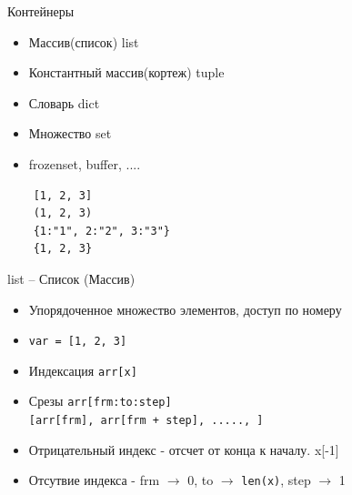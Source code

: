 \documentclass{article}
\begin{document}
\LARGE

\begin{center} Контейнеры \end{center}
\begin{itemize}
	\item Массив(список) list
	\item Константный массив(кортеж) tuple
	\item Словарь dict
	\item Множество set
	\item frozenset, buffer, ....
\end{itemize}
\begin{lstlisting}
	[1, 2, 3]
	(1, 2, 3)
	{1:"1", 2:"2", 3:"3"}
	{1, 2, 3}
\end{lstlisting}
\newpage

\begin{center} list – Список (Массив) \end{center}
\begin{itemize}
	\item Упорядоченное множество элементов, доступ по номеру
	\item \lstinline!var = [1, 2, 3]!
	\item Индексация \lstinline!arr[x]!
	\item Срезы 
			\lstinline!arr[frm:to:step]! \\
			\lstinline![arr[frm], arr[frm + step], ....., ]!
	\item Отрицательный индекс - отсчет от конца к началу. x[-1]
	\item Отсутвие индекса - frm $\rightarrow$ 0, to $\rightarrow$ \lstinline!len(x)!, 
	        step $\rightarrow$ 1
\end{itemize}
\newpage
\end{document}
